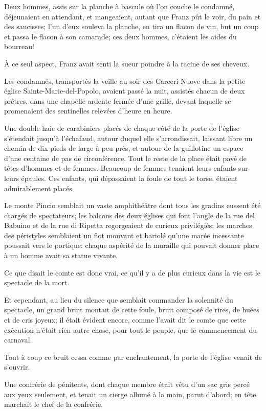 Deux hommes, assis sur la planche à bascule où l'on couche le condamné, déjeunaient en attendant, et mangeaient, autant que Franz pût le voir, du pain et des saucisses; l'un d'eux souleva la planche, en tira un flacon de vin, but un coup et passa le flacon à son camarade; ces deux hommes, c'étaient les aides du bourreau! 

À ce seul aspect, Franz avait senti la sueur poindre à la racine de ses cheveux. 

Les condamnés, transportés la veille au soir des Carceri Nuove dans la petite église Sainte-Marie-del-Popolo, avaient passé la nuit, assistés chacun de deux prêtres, dans une chapelle ardente fermée d'une grille, devant laquelle se promenaient des sentinelles relevées d'heure en heure. 

Une double haie de carabiniers placés de chaque côté de la porte de l'église s'étendait jusqu'à l'échafaud, autour duquel elle s'arrondissait, laissant libre un chemin de dix pieds de large à peu près, et autour de la guillotine un espace d'une centaine de pas de circonférence. Tout le reste de la place était pavé de têtes d'hommes et de femmes. Beaucoup de femmes tenaient leurs enfants sur leurs épaules. Ces enfants, qui dépassaient la foule de tout le torse, étaient admirablement placés. 

Le monte Pincio semblait un vaste amphithéâtre dont tous les gradins eussent été chargés de spectateurs; les balcons des deux églises qui font l'angle de la rue del Babuino et de la rue di Ripetta regorgeaient de curieux privilégiés; les marches des péristyles semblaient un flot mouvant et bariolé qu'une marée incessante poussait vers le portique: chaque aspérité de la muraille qui pouvait donner place à un homme avait sa statue vivante. 

Ce que disait le comte est donc vrai, ce qu'il y a de plus curieux dans la vie est le spectacle de la mort. 

Et cependant, au lieu du silence que semblait commander la solennité du spectacle, un grand bruit montait de cette foule, bruit composé de rires, de huées et de cris joyeux; il était évident encore, comme l'avait dit le comte que cette exécution n'était rien autre chose, pour tout le peuple, que le commencement du carnaval. 

Tout à coup ce bruit cessa comme par enchantement, la porte de l'église venait de s'ouvrir. 

Une confrérie de pénitents, dont chaque membre était vêtu d'un sac gris percé aux yeux seulement, et tenait un cierge allumé à la main, parut d'abord; en tête marchait le chef de la confrérie. 

